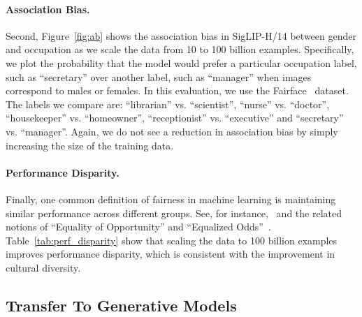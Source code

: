 \paragraph{Association Bias.} Second, Figure~\ref{fig:ab} shows the association bias in SigLIP-H/14 between gender and occupation as we scale the data from 10 to 100 billion examples. Specifically, we plot the probability that the model would prefer a particular occupation label, such as ``{\selectfont secretary}'' over another label, such as ``{\selectfont manager}'' when images correspond to males or females. In this evaluation, we use the Fairface~\cite{karkkainen2021fairface} dataset. The labels we compare are: ``{\selectfont librarian}'' vs. ``{\selectfont scientist}'', ``{\selectfont nurse}'' vs. ``{\selectfont doctor}'', ``{\selectfont housekeeper}'' vs. ``{\selectfont homeowner}'', ``{\selectfont receptionist}'' vs. ``{\selectfont executive}'' and ``{\selectfont secretary}'' vs. ``{\selectfont manager}''. Again, we do not see a reduction in association bias by simply increasing the size of the training data. %


\paragraph{Performance Disparity.} Finally, one common definition of fairness in machine learning is maintaining similar performance across different groups. See, for instance,~\citet{dehghani2023scaling} and the related notions of ``Equality of Opportunity'' and ``Equalized Odds''~\cite{hardt2016equalityopportunitysupervisedlearning}. Table~\ref{tab:perf_disparity} show that scaling the data to 100 billion examples improves performance disparity, which is consistent with the improvement in cultural diversity.

% 




\subsection{Transfer To Generative Models}
\label{sec:transfer}


